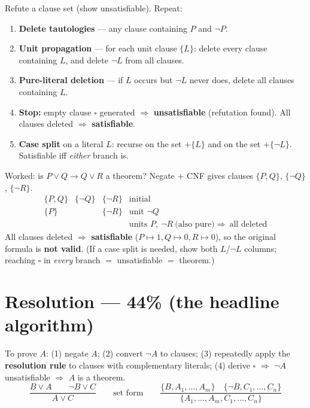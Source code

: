\documentclass[11pt,a4paper]{article}
\newcommand{\imp}{\rightarrow}
\begin{document}
\begin{must}
Refute a clause set (show unsatisfiable). Repeat:
\begin{enumerate}[leftmargin=*,itemsep=0pt]
  \item \textbf{Delete tautologies} --- any clause containing $P$ and $\neg P$.
  \item \textbf{Unit propagation} --- for each unit clause $\{L\}$: delete every clause containing $L$, and delete $\neg L$ from all clauses.
  \item \textbf{Pure-literal deletion} --- if $L$ occurs but $\neg L$ never does, delete all clauses containing $L$.
  \item \textbf{Stop:} empty clause $\square$ generated $\Rightarrow$ \textbf{unsatisfiable} (refutation found). All clauses deleted $\Rightarrow$ \textbf{satisfiable}.
  \item \textbf{Case split} on a literal $L$: recurse on the set $+\{L\}$ and on the set $+\{\neg L\}$. Satisfiable iff \emph{either} branch is.
\end{enumerate}
\end{must}

\begin{plain}{Worked: is $P\vee Q\imp Q\vee R$ a theorem?}
Negate $+$ CNF gives clauses $\{P,Q\}$, $\{\neg Q\}$, $\{\neg R\}$.
\[
\begin{array}{llll}
\{P,Q\} & \{\neg Q\} & \{\neg R\} & \text{initial}\\
\{P\}   &           & \{\neg R\} & \text{unit }\neg Q\\
        &           &            & \text{units }P,\ \neg R\ \text{(also pure)} \Rightarrow\ \text{all deleted}
\end{array}
\]
All clauses deleted $\Rightarrow$ \textbf{satisfiable} ($P\mapsto1,Q\mapsto0,R\mapsto0$), so the original formula is \textbf{not valid}. (If a case split is needed, show both $L$/$\neg L$ columns; reaching $\square$ in \emph{every} branch $=$ unsatisfiable $=$ theorem.)
\end{plain}

\section{Resolution --- 44\% (the headline algorithm)}

\begin{must}[title=Resolution refutation]
To prove $A$: (1) negate $A$; (2) convert $\neg A$ to clauses; (3) repeatedly apply the \textbf{resolution rule} to clauses with complementary literals; (4) derive $\square$ $\Rightarrow$ $\neg A$ unsatisfiable $\Rightarrow$ $A$ is a theorem.
\[
\frac{B\vee A \qquad \neg B\vee C}{A\vee C}
\qquad\text{set form}\qquad
\frac{\{B,A_1,\dots,A_m\}\quad \{\neg B,C_1,\dots,C_n\}}{\{A_1,\dots,A_m,C_1,\dots,C_n\}}
\]
\end{must}
\end{document}
